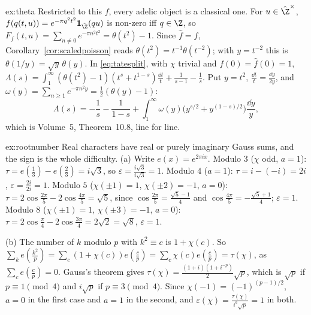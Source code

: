 \begin{solution}{ex:theta}
\idea Restricted to this $f$, every adelic object is a classical one.
\writeup For $u\in\hat{\Z}^\times$, $f(q(t,u))=e^{-\pi q^2t^2}\mathbf 1_{\hat{\Z}}(qu)$ is non-zero iff $q\in\Z$, so $F_f(t,u)=\sum_{n\ne0}e^{-\pi n^2t^2}=\theta(t^2)-1$.
Since $\hat f=f$, Corollary~\ref{cor:scaledpoisson} reads $\theta(t^2)=t^{-1}\theta(t^{-2})$; with $y=t^{-2}$ this is $\theta(1/y)=\sqrt y\,\theta(y)$. In
\eqref{eq:tatesplit}, with $\chi$ trivial and $f(0)=\hat f(0)=1$, $\Lambda(s)=\int_1^\infty(\theta(t^2)-1)(t^s+t^{1-s})\frac{\dd t}t+\frac1{s-1}-\frac1s$. Put $y=t^2$,
$\frac{\dd t}t=\frac{\dd y}{2y}$, and $\omega(y)=\sum_{n\ge1}e^{-\pi n^2y}=\frac12(\theta(y)-1)$:
\[
\Lambda(s)=-\frac1s-\frac1{1-s}+\int_1^\infty\omega(y)\bigl(y^{s/2}+y^{(1-s)/2}\bigr)\frac{\dd y}y,
\]
which is Volume~5, Theorem~10.8, line for line.
\end{solution}

\begin{solution}{ex:rootnumber}
\idea Real characters have real or purely imaginary Gauss sums, and the sign is the whole difficulty.
\writeup (a) Write $e(x)=e^{2\pi ix}$. Modulo $3$ ($\chi$ odd, $a=1$): $\tau=e(\frac13)-e(\frac23)=i\sqrt3$, so $\varepsilon=\frac{i\sqrt3}{i\sqrt3}=1$. Modulo $4$
($a=1$): $\tau=i-(-i)=2i$, $\varepsilon=\frac{2i}{2i}=1$. Modulo $5$ ($\chi(\pm1)=1$, $\chi(\pm2)=-1$, $a=0$): $\tau=2\cos\frac{2\pi}5-2\cos\frac{4\pi}5=\sqrt5$, since
$\cos\frac{2\pi}5=\frac{\sqrt5-1}4$ and $\cos\frac{4\pi}5=-\frac{\sqrt5+1}4$; $\varepsilon=1$. Modulo $8$ ($\chi(\pm1)=1$, $\chi(\pm3)=-1$, $a=0$):
$\tau=2\cos\frac\pi4-2\cos\frac{3\pi}4=2\sqrt2=\sqrt8$, $\varepsilon=1$.

(b) The number of $k$ modulo $p$ with $k^2\equiv c$ is $1+\chi(c)$. So $\sum_ke(\frac{k^2}p)=\sum_c(1+\chi(c))e(\frac cp)=\sum_c\chi(c)e(\frac cp)=\tau(\chi)$, as
$\sum_ce(\frac cp)=0$. Gauss's theorem gives $\tau(\chi)=\frac{(1+i)(1+i^{-p})}2\sqrt p$, which is $\sqrt p$ if $p\equiv1\pmod4$ and $i\sqrt p$ if $p\equiv3\pmod4$. Since
$\chi(-1)=(-1)^{(p-1)/2}$, $a=0$ in the first case and $a=1$ in the second, and $\varepsilon(\chi)=\frac{\tau(\chi)}{i^a\sqrt p}=1$ in both.
\end{solution}

